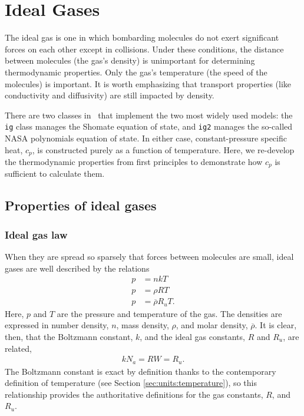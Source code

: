 \chapter{Ideal Gases}\label{ch:ig}

The ideal gas is one in which bombarding molecules do not exert significant forces on each other except in collisions.  Under these conditions, the distance between molecules (the gas's density) is unimportant for determining thermodynamic properties.  Only the gas's temperature (the speed of the molecules) is important.  It is worth emphasizing that transport properties (like conductivity and diffusivity) are still impacted by density.

There are two classes in \PM\ that implement the two most widely used models: the \verb|ig| class manages the Shomate equation of state, and \verb|ig2| manages the so-called NASA polynomials equation of state.  In either case, constant-pressure specific heat, $c_p$, is constructed purely as a function of temperature.  Here, we re-develop the thermodynamic properties from first principles to demonstrate how $c_p$ is sufficient to calculate them.

\section{Properties of ideal gases}

\subsection{Ideal gas law}\label{sec:iglaw}

When they are spread so sparsely that forces between molecules are small, ideal gases are well described by the relations
\begin{subequations}
\begin{align}
p &= n k T\label{eqn:ig:k}\\
p &= \rho R T\label{eqn:ig:r}\\
p &= \overline{\rho} R_u T\label{eqn:ig:ru}.
\end{align}
\end{subequations}
Here, $p$ and $T$ are the pressure and temperature of the gas.  The densities are expressed in number density, $n$, mass density, $\rho$, and molar density, $\overline{\rho}$.  It is clear, then, that the Boltzmann constant, $k$, and the ideal gas constants, $R$ and $R_u$, are related,
\begin{align}
k N_a = R W = R_u.
\end{align}
The Boltzmann constant is exact by definition thanks to the contemporary definition of temperature (see Section \ref{sec:units:temperature}), so this relationship provides the authoritative definitions for the gas constants, $R$, and $R_u$.

